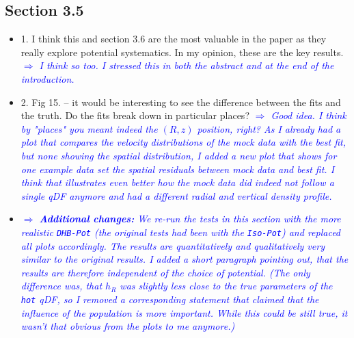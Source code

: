 \documentclass[10pt,a4paper]{article}
\newcommand{\Comment}[1]{\textsl{\textcolor{Blue}{$\Longrightarrow$ {#1}}}}
\begin{document}
\subsection{Section 3.5}
\begin{itemize}
\item 1. I think this and section 3.6 are the most valuable in the paper as they really explore potential systematics. In my opinion, these are the key results. \Comment{I think so too. I stressed this in both the abstract and at the end of the introduction.}
\item 2. Fig 15. -- it would be interesting to see the difference between the fits and the truth. Do the fits break down in particular places? \Comment{Good idea. I think by "places" you meant indeed the $(R,z)$ position, right? As I already had a plot that compares the velocity distributions of the mock data with the best fit, but none showing the spatial distribution, I added a new plot that shows for one example data set the spatial residuals between mock data and best fit. I think that illustrates even better how the mock data did indeed not follow a single qDF anymore and had a different radial and vertical density profile.}
\item \Comment{\textbf{Additional changes:} We re-run the tests in this section with the more realistic \texttt{DHB-Pot} (the original tests had been with the \texttt{Iso-Pot}) and replaced all plots accordingly. The results are quantitatively and qualitatively very similar to the original results. I added a short paragraph pointing out, that the results are therefore independent of the choice of potential. (The only difference was, that $h_R$ was slightly less close to the true parameters of the \texttt{hot} qDF, so I removed a corresponding statement that claimed that the influence of the \text{hot} population is more important. While this could be still true, it wasn't that obvious from the plots to me anymore.)}
\end{itemize}
\end{document}
